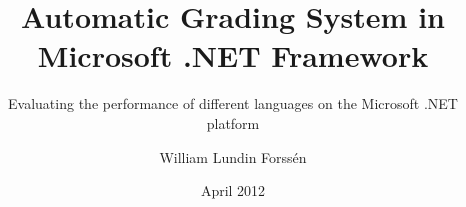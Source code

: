 \title{Automatic Grading System in Microsoft .NET Framework}

\subtitle{Evaluating the performance of different languages on the Microsoft .NET platform}


\author{William Lundin Forss\'{e}n}
\date{April 2012}
